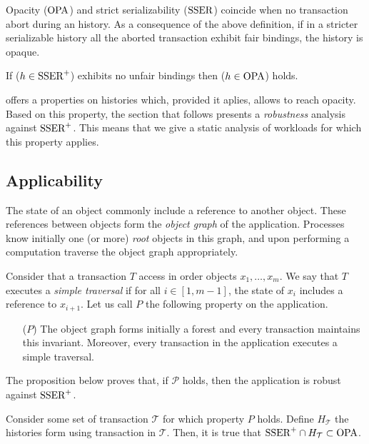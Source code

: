 Opacity ($\OPA$) and strict serializability ($\SSER$) coincide when no transaction abort during an history.
As a consequence of the above definition, if in a stricter serializable history all the aborted transaction exhibit fair bindings, the history is opaque.

\begin{corollary}
  If ($h \in \SPSER$) exhibits no unfair bindings then ($h \in \OPA$) holds.
\end{corollary}

 offers a properties on histories which, provided it aplies, allows to reach opacity.
Based on this property, the section that follows presents a \emph{robustness} analysis against $\SPSER$.
This means that we give a static analysis of workloads for which this property applies.

\subsection{Applicability}

The state of an object commonly include a reference to another object.
These references between objects form the \emph{object graph} of the application.
Processes know initially one (or more) \emph{root} objects in this graph, and upon performing a computation traverse the object graph appropriately.

Consider that a transaction $T$ access in order objects $x_1, \ldots, x_m$.
We say that $T$ executes a \emph{simple traversal} if for all $i \in [1,m-1]$, the state of $x_i$ includes a reference to $x_{i+1}$.
Let us call $P$ the following property on the application.

\begin{itemize}
\item[($P$)]
  The object graph forms initially a forest and every transaction maintains this invariant.
  Moreover, every transaction in the application executes a simple traversal.
\end{itemize}

The proposition below proves that, if $\mathcal{P}$ holds, then the application is robust against $\SPSER$.

\begin{proposition}
  Consider some set of transaction $\mathcal{T}$ for which property $P$ holds.
  Define $H_{\mathcal{T}}$ the histories form using transaction in $\mathcal{T}$.
  Then, it is true that $\SPSER \inter H_{\mathcal{T}} \subset \OPA$.
\end{proposition}

